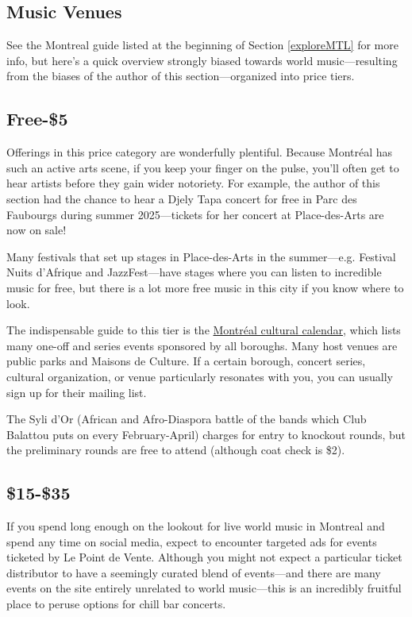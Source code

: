 \subsection{Music Venues}
See the Montreal guide listed at the beginning of Section \hyperref[exploreMTL]{\textcolor{purble}{\ref*{exploreMTL}}}  for more info, but here's a quick overview strongly biased towards world music---resulting from the biases of the author of this section---organized into price tiers. 
\subsection*{Free-\$5}
Offerings in this price category are wonderfully plentiful. Because Montréal has such an active arts scene, if you keep your finger on the pulse, you'll often get to hear artists before they gain wider notoriety. For example, the author of this section had the chance to hear a Djely Tapa concert for free in Parc des Faubourgs during summer 2025---tickets for her concert at Place-des-Arts are now on sale!

Many festivals that set up stages in Place-des-Arts in the summer---e.g. Festival Nuits d'Afrique and JazzFest---have stages where you can listen to incredible music for free, but there is a lot more free music in this city if you know where to look. 

The indispensable guide to this tier is the \href{https://montreal.ca/calendrier-culturel?mtl_content.evenements.event_type.subType.code=TEV15&shownResults=12}{Montréal cultural calendar}, which lists many one-off and series events sponsored by all boroughs. Many host venues are public parks and Maisons de Culture. If a certain borough, concert series, cultural organization, or venue particularly resonates with you, you can usually sign up for their mailing list. 

The Syli d'Or (African and Afro-Diaspora battle of the bands which Club Balattou puts on every February-April) charges for entry to knockout rounds, but the preliminary rounds are free to attend (although coat check is \$2).

\subsection*{\$15-\$35}
If you spend long enough on the lookout for live world music in Montreal and spend any time on social media, expect to encounter targeted ads for events ticketed by Le Point de Vente. Although you might not expect a particular ticket distributor to have a seemingly curated blend of events---and there are many events on the site entirely unrelated to world music---this is an incredibly fruitful place to peruse options for chill bar concerts. 

